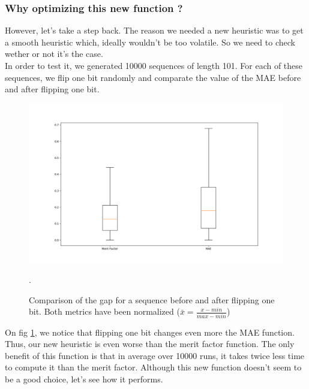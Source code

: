 \documentclass[a4paper,11pt,openany]{article}
\begin{document}
\subsubsection{Why optimizing this new function ?}
\noindent
However, let's take a step back. The reason we needed a new heuristic was to get a smooth heuristic which, ideally wouldn't be too volatile. So we need to check wether or not it's the case.\\
In order to test it, we generated 10000 sequences of length 101. For each of these sequences, we flip one bit randomly and comparate the value of the MAE before and after flipping one bit.\\
\begin{figure}[H]
\begin{center}
\includegraphics[scale=0.2]{Images/compare_mf_mae}
\caption{Comparison of the gap for a sequence before and after flipping one bit. Both metrics have been normalized ($\bar{x}=\frac{x-min}{max-min}$)}.
\label{fig:compare_mf_mae}
\end{center}
\end{figure}
\noindent
On fig \ref{fig:compare_mf_mae}, we notice that flipping one bit changes even more the MAE function. Thus, our new heuristic is even worse than the merit factor function. The only benefit of this function is that in average over 10000 runs, it takes twice less time to compute it than the merit factor. Although this new function doesn't seem to be a good choice, let's see how it performs.
\end{document}
